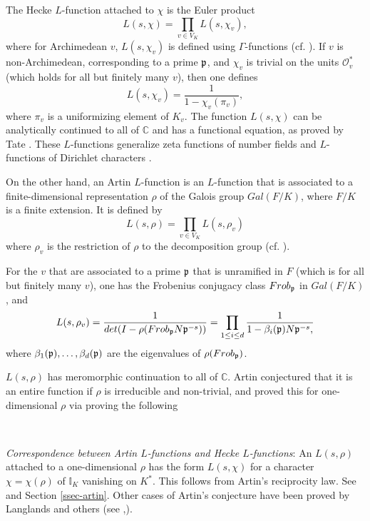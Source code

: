 \documentclass[12pt]{amsart}
\def\I{\mathbb{I}}
\def\C{\mathbb{C}}
\def\C{\mathbb{C}}
\def\cO{\mathcal{O}}
\numberwithin{equation}{section}
\begin{document}
The Hecke $L$-function attached to $\chi$ is the Euler product 
$$L(s,\chi)=\prod_{v\in V_K} L(s,\chi_v),$$
where for Archimedean $v$, $L(s,\chi_v)$ is defined using $\Gamma$-functions (cf. \cite{ramak}). If $v$ is non-Archimedean, corresponding to a prime $\frak p$, and $\chi_v$ is trivial on the units $\cO_v^*$ (which holds for all but finitely many $v$), then one defines  
$$L(s,\chi_v)=\frac{1}{1-\chi_v(\pi_v)},$$
where $\pi_v$ is a uniformizing element of $K_v$. The function $L(s,\chi)$ can be analytically continued to all of $\C$ and has a functional equation, as proved by Tate \cite{tate-thesis}. These $L$-functions generalize zeta functions of number fields and $L$-functions of Dirichlet characters \cite{ramak}.


On the other hand, an Artin $L$-function is an $L$-function that is associated to a finite-dimensional representation $\rho$ of the Galois group 
$Gal(F/K)$, where $F/K$ is a finite extension. It is defined by
$$L(s,\rho)=\prod_{v\in V_K} L(s,\rho_v)$$
where $\rho_v$ is the restriction of $\rho$ to the decomposition group (cf. \cite{ramak}).

For the $v$ that are associated to a prime $\frak p$ that 
is unramified in $F$ (which is for all but finitely many $v$), one has the Frobenius conjugacy class $Frob_{\frak p}$ in $Gal(F/K)$, and
$$L(s,\rho_v)=\frac{1}{det(I-\rho(Frob_{\frak p}N\frak p^{-s}))}=\prod_{1\leq i\leq d} \frac{1}{1-\beta_i(\frak p)N\frak p^{-s},}$$
where $\beta_1(\frak p),\dots,\beta_d(\frak p)$ are the eigenvalues of $\rho(Frob_{\frak p})$.

$L(s,\rho)$ has meromorphic continuation to all of $\C$. Artin conjectured that it is an entire function if $\rho$ is irreducible and non-trivial, and proved this for one-dimensional $\rho$ via proving the following 

\

{\it Correspondence between Artin $L$-functions and Hecke $L$-functions}: An $L(s,\rho)$ attached to a one-dimensional $\rho$ has the form $L(s,\chi)$ for a character $\chi=\chi(\rho)$ of $\I_K$ vanishing on $K^*$. This follows from Artin's reciprocity law. See \cite{ramak} and Section \ref{ssec-artin}. Other cases of Artin's conjecture have been proved by Langlands and others (see \cite{lang-prob},\cite{lang-icm}).
\end{document}
